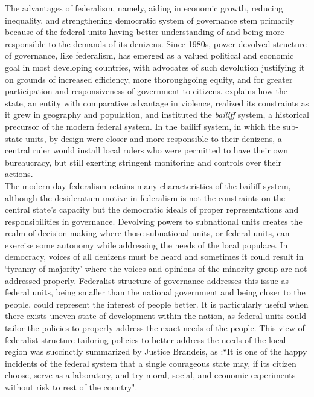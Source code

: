  
The advantages of federalism, namely, aiding in economic growth, reducing inequality, and strengthening democratic system of governance stem primarily because of the federal units having better understanding of and being more responsible to the demands of its denizens. Since 1980s, power devolved structure of governance, like federalism, has emerged as a valued political and economic goal in most developing countries, with advocates of such devolution justifying it on grounds of increased efficiency, more thoroughgoing equity, and for greater participation and responsiveness of government to citizens\cite{Agrawal2000}.   explains how the state, an entity with comparative advantage in violence, realized its constraints as it grew in geography and population, and instituted the \emph{bailiff} system, a historical precursor of the modern federal system. In the bailiff system, in which the sub-state units, by design were closer and more responsible to their denizens, a central ruler would install local rulers who were permitted to have their own bureaucracy, but still exerting stringent monitoring and controls over their actions.\\
 The modern day federalism retains many characteristics of the bailiff system, although the desideratum motive in federalism is not the constraints on the central state's capacity but the democratic ideals of proper representations and responsibilities in governance. Devolving powers to subnational units creates the realm of decision making where those subnational units, or federal units, can exercise some autonomy while addressing the needs of the local populace. In democracy, voices of all denizens must be heard and sometimes it could result in `tyranny of majority' where the voices and opinions of the minority group are not addressed properly. Federalist structure of governance addresses this issue as federal units, being smaller than the national government and being closer to the people, could represent the interest of people better. It is particularly useful when there exists uneven state of development within the nation, as federal units could tailor the policies to properly address the exact needs of the people. This view of federalist structure tailoring policies to better address the needs of the local region was succinctly summarized by Justice Brandeis, as :``It is one of the happy incidents of the federal system that a single courageous state may, if its citizen choose, serve as a laboratory, and try moral, social, and economic experiments without risk to rest of the country"\cite{Rosen2016}. \\

